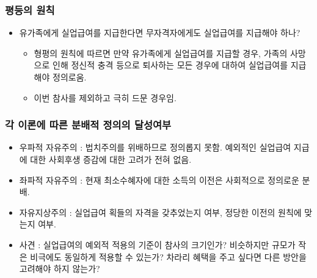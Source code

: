 \documentclass[aspectratio=169,xcolor=dvipsnames,]{beamer}
\begin{document}
\begin{frame}[<+->]
\frametitle{평등의 원칙}
    \begin{itemize}
        \item 유가족에게 실업급여를 지급한다면 무자격자에게도 실업급여를 지급해야 하나?
        \begin{itemize}
            \item 형평의 원칙에 따르면 만약 유가족에게 실업급여를 지급할 경우, 가족의 사망으로 인해 정신적 충격 등으로 퇴사하는 모든 경우에 대하여 실업급여를 지급해야 정의로움.
            \item 이번 참사를 제외하고 극히 드문 경우임.
        \end{itemize}
    \end{itemize}
\end{frame}


\begin{frame}[<+->]
\frametitle{각 이론에 따른 분배적 정의의 달성여부}
    \begin{itemize}
        \item 우파적 자유주의 : 법치주의를 위배하므로 정의롭지 못함. 예외적인 실업급여 지급에 대한 사회후생 증감에 대한 고려가 전혀 없음.
        \item 좌파적 자유주의 : 현재 최소수혜자에 대한 소득의 이전은 사회적으로 정의로운 분배.
        \item 자유지상주의 : 실업급여 획들의 자격을 갖추었는지 여부, 정당한 이전의 원칙에 맞는지 여부.
        \item 사견 : 실업급여의 예외적 적용의 기준이 참사의 크기인가? 비슷하지만 규모가 작은 비극에도 동일하게 적용할 수 있는가? 차라리 혜택을 주고 싶다면 다른 방안을 고려해야 하지 않는가?
    \end{itemize}
\end{frame}
\end{document}
